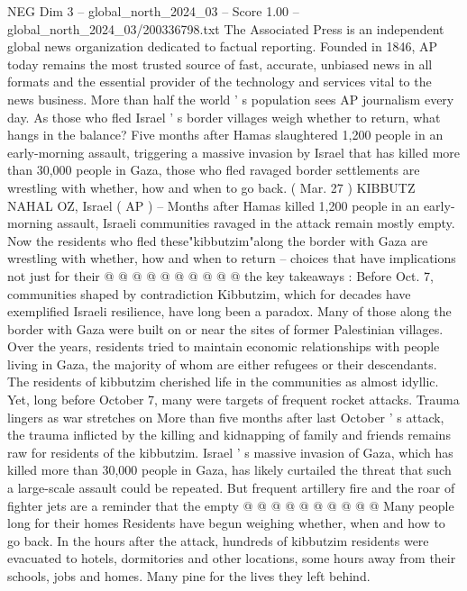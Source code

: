 \begin{textsample}{NEG Dim 3 – global\_north\_2024\_03 – Score 1.00 – global\_north\_2024\_03/200336798.txt}  \label{ex:f3_neg_162}
The Associated Press is an independent global news organization dedicated to factual reporting.
Founded in 1846, AP today remains the most trusted source of fast, accurate, unbiased news in all formats and the essential provider of the technology and services vital to the news business.
More than half the world ' s population sees AP journalism every day.
As those who fled Israel ' s border villages weigh whether to return, what hangs in the balance?
Five months after Hamas slaughtered 1,200 people in an early-morning assault, triggering a massive invasion by Israel that has killed more than 30,000 people in Gaza, those who fled ravaged border settlements are wrestling with whether, how and when to go back. ( Mar. 27 ) KIBBUTZ NAHAL OZ, Israel ( AP ) -- Months after Hamas killed 1,200 people in an early-morning assault, Israeli communities ravaged in the attack remain mostly empty.
Now the residents who fled these"kibbutzim"along the border with Gaza are wrestling with whether, how and when to return -- choices that have implications not just for their @ @ @ @ @ @ @ @ @ @ the key takeaways : Before Oct. 7, communities shaped by contradiction Kibbutzim, which for decades have exemplified Israeli resilience, have long been a paradox.
Many of those along the border with Gaza were built on or near the sites of former Palestinian villages.
Over the years, residents tried to maintain economic relationships with people living in Gaza, the majority of whom are either refugees or their descendants.
The residents of kibbutzim cherished life in the communities as almost idyllic.
Yet, long before October 7, many were targets of frequent rocket attacks.
Trauma lingers as war stretches on More than five months after last October ' s attack, the trauma inflicted by the killing and kidnapping of family and friends remains raw for residents of the kibbutzim.
Israel ' s massive invasion of Gaza, which has killed more than 30,000 people in Gaza, has likely curtailed the threat that such a large-scale assault could be repeated.
But frequent artillery fire and the roar of fighter jets are a reminder that the empty @ @ @ @ @ @ @ @ @ @ Many people long for their homes Residents have begun weighing whether, when and how to go back.
In the hours after the attack, hundreds of kibbutzim residents were evacuated to hotels, dormitories and other locations, some hours away from their schools, jobs and homes.
Many pine for the lives they left behind.

\end{textsample}
